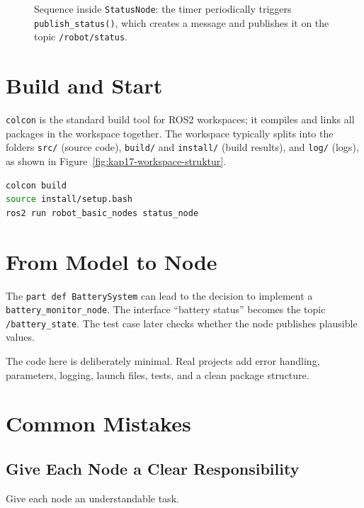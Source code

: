 \begin{figure}[H]
  \centering
  \caption{Sequence inside \texttt{StatusNode}: the timer periodically triggers \texttt{publish\_status()}, which creates a message and publishes it on the topic \texttt{/robot/status}.}
  \label{fig:kap17-ablauf-publisher-timer}
\end{figure}

\section{Build and Start}
\texttt{colcon} is the standard build tool for ROS2 workspaces; it compiles and links all packages in the workspace together. The workspace typically splits into the folders \texttt{src/} (source code), \texttt{build/} and \texttt{install/} (build results), and \texttt{log/} (logs), as shown in Figure~\ref{fig:kap17-workspace-struktur}.

\begin{lstlisting}[language=bash]
colcon build
source install/setup.bash
ros2 run robot_basic_nodes status_node
\end{lstlisting}

\section{From Model to Node}
The \texttt{part def BatterySystem} can lead to the decision to implement a \texttt{battery\_monitor\_node}. The interface \enquote{battery status} becomes the topic \texttt{/battery\_state}. The test case later checks whether the node publishes plausible values.

\begin{hinweisbox}
The code here is deliberately minimal. Real projects add error handling, parameters, logging, launch files, tests, and a clean package structure.
\end{hinweisbox}

\section{Common Mistakes}
\subsection{Give Each Node a Clear Responsibility}
Give each node an understandable task.

